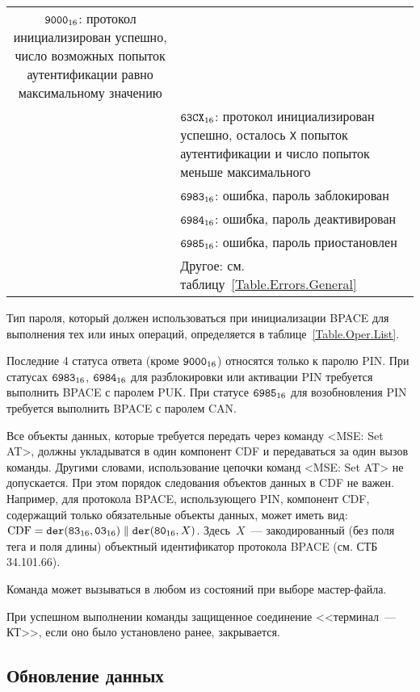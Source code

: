 \begin{table}[h!]
\begin{tabular}{|c|p{14cm}|}
$\texttt{9000}_{16}$: протокол инициализирован успешно,
число возможных попыток аутентификации равно максимальному значению\\
\cline{2-2}
& $\texttt{63CX}_{16}$: протокол инициализирован успешно,
осталось \texttt{X} попыток аутентификации и число попыток меньше максимального\\
\cline{2-2}
& $\texttt{6983}_{16}$: ошибка, пароль заблокирован\\
\cline{2-2}
& $\texttt{6984}_{16}$: ошибка, пароль деактивирован\\
\cline{2-2}
& $\texttt{6985}_{16}$: ошибка, пароль приостановлен\\
\cline{2-2}
& Другое: см. таблицу~\ref{Table.Errors.General}\\
\hline
\end{tabular}
\end{table}

Тип пароля, который должен использоваться при 
инициализации BPACE для выполнения тех или иных
операций, определяется в таблице~\ref{Table.Oper.List}.

Последние 4 статуса ответа (кроме $\texttt{9000}_{16}$) относятся только к паролю PIN.
При статусах $\texttt{6983}_{16}$, $\texttt{6984}_{16}$ для разблокировки или активации PIN 
требуется выполнить BPACE с паролем PUK. При статусе $\texttt{6985}_{16}$ для 
возобновления PIN требуется выполнить BPACE с паролем CAN.

Все объекты данных, которые требуется передать через команду <MSE: Set AT>,
должны укладыватся в один компонент CDF и передаваться за один вызов команды.
Другими словами, использование цепочки команд <MSE: Set AT> не допускается. 
При этом порядок следования объектов данных в CDF не важен. 
Например, для протокола BPACE, использующего PIN, компонент CDF, 
содержащий только обязательные объекты данных, может иметь вид: 
$\text{CDF} = \texttt{der}(\texttt{83}_{16},\texttt{03}_{16}) \parallel \texttt{der}(\texttt{80}_{16}, X)$. 
Здесь~$X$~--- закодированный (без поля тега и поля длины) объектный 
идентификатор протокола BPACE (см. СТБ 34.101.66).

 
Команда может вызываться в любом из состояний при выборе мастер-файла.

При успешном выполнении команды защищенное соединение <<терминал~--- КТ>>,
если оно было установлено ранее, закрывается.

\subsection{Обновление данных}
\label{Oper.Descr.Update}

